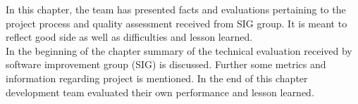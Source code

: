 In this chapter, the team has presented facts and evaluations pertaining to the project process and quality assessment received from SIG group. It is meant to reflect good side as well as difficulties and lesson learned.\\

In the beginning of the chapter summary of the technical evaluation received by software improvement group (SIG) is discussed. Further some metrics and information regarding project is mentioned. In the end of this chapter development team evaluated their own performance and lesson learned.    